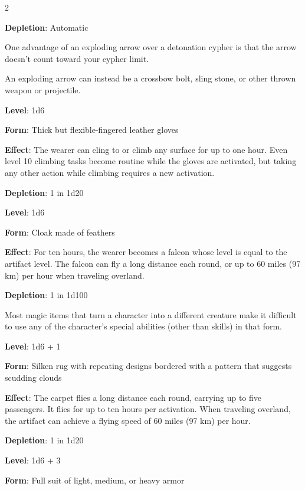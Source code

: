 \begin{multicols}{2}

\textbf{Depletion}: Automatic 

One advantage of an exploding arrow over a detonation cypher is that the arrow doesn’t count toward your cypher limit. 

An exploding arrow can instead be a crossbow bolt, sling stone, or other thrown weapon or projectile.


\textbf{Level}: 1d6 

\textbf{Form}: Thick but flexible-fingered leather gloves 

\textbf{Effect}: The wearer can cling to or climb any surface for up to one hour. Even level 10 climbing tasks become routine while the gloves are activated, but taking any other action while climbing requires a new activation. 

\textbf{Depletion}: 1 in 1d20


\textbf{Level}: 1d6 

\textbf{Form}: Cloak made of feathers 

\textbf{Effect}: For ten hours, the wearer becomes a falcon whose level is equal to the artifact level. The falcon can fly a long distance each round, or up to 60 miles (97 km) per hour when traveling overland. 

\textbf{Depletion}: 1 in 1d100

Most magic items that turn a character into a different creature make it difficult to use any of the character’s special abilities (other than skills) in that form.


\textbf{Level}: 1d6 + 1

\textbf{Form}: Silken rug with repeating designs bordered with a pattern that suggests scudding clouds 

\textbf{Effect}: The carpet flies a long distance each round, carrying up to five passengers. It flies for up to ten hours per activation. When traveling overland, the artifact can achieve a flying speed of 60 miles (97 km) per hour. 

\textbf{Depletion}: 1 in 1d20 


\textbf{Level}: 1d6 + 3 

\textbf{Form}: Full suit of light, medium, or heavy armor 


\end{multicols}
